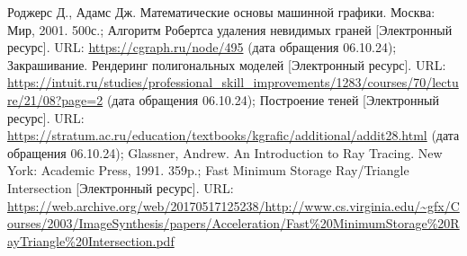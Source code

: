 \begin{thebibliography}{}
	 Роджерс Д., Адамс Дж. Математические основы машинной графики. Москва: Мир, 2001. 500с.;
	 Алгоритм Робертса удаления невидимых граней [Электронный ресурс]. URL: \url{https://cgraph.ru/node/495} (дата обращения 06.10.24);
	 Закрашивание. Рендеринг полигональных моделей [Электронный ресурс]. URL: \url{https://intuit.ru/studies/professional\_skill\_improvements/1283/courses/70/lecture/21/08?page=2} (дата обращения 06.10.24);
	 Построение теней [Электронный ресурс]. URL: \url{https://stratum.ac.ru/education/textbooks/kgrafic/additional/addit28.html} (дата обращения 06.10.24);
	 Glassner, Andrew. An Introduction to Ray Tracing. New York: Academic Press, 1991. 359p.;
	 Fast Minimum Storage Ray/Triangle Intersection [Электронный ресурс]. URL: \url{https://web.archive.org/web/20170517125238/http://www.cs.virginia.edu/~gfx/Courses/2003/ImageSynthesis/papers/Acceleration/Fast\%20MinimumStorage\%20RayTriangle\%20Intersection.pdf}
\end{thebibliography}
